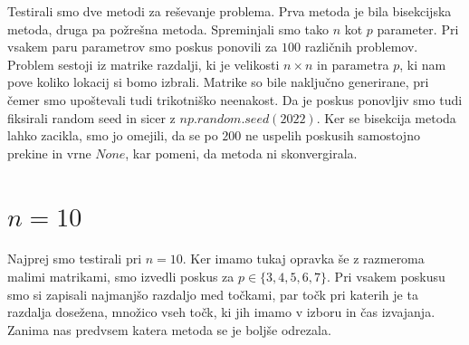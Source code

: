\documentclass[a4paper]{article}
\title{}
\begin{document}
\maketitle

Testirali smo dve metodi za reševanje problema. Prva metoda je bila bisekcijska metoda, druga pa požrešna metoda. Spreminjali smo tako $n$ kot $p$ parameter. Pri vsakem paru parametrov smo poskus ponovili za $100$ različnih problemov. Problem sestoji iz matrike razdalji, ki je velikosti $n \times n$ in parametra $p$, ki nam pove koliko lokacij si bomo izbrali. Matrike so bile naključno generirane, pri čemer smo upoštevali tudi trikotniško neenakost. Da je poskus ponovljiv smo tudi fiksirali random seed in sicer z $np.random.seed(2022)$. Ker se bisekcija metoda lahko zacikla, smo jo omejili, da se po $200$ ne uspelih poskusih samostojno prekine in vrne $None$, kar pomeni, da metoda ni skonvergirala. 

\section{$n = 10$}
Najprej smo testirali pri $n = 10$. Ker imamo tukaj opravka še z razmeroma malimi matrikami, smo izvedli poskus za $p \in \{3, 4, 5, 6, 7\}$. Pri vsakem poskusu smo si zapisali najmanjšo razdaljo med točkami, par točk pri katerih je ta razdalja dosežena, množico vseh točk, ki jih imamo v izboru in čas izvajanja. Zanima nas predvsem katera metoda se je boljše odrezala. 
\end{document}
